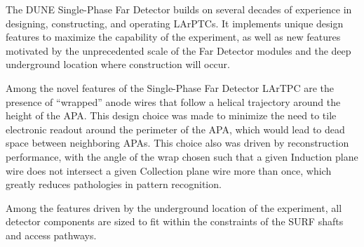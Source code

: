 The DUNE Single-Phase Far Detector builds on several decades of experience in
designing, constructing, and operating LArPTCs.  It implements unique design features to maximize the capability of the experiment, as well
as new features motivated by the unprecedented scale of the Far Detector
modules and the deep underground location where construction will occur.

Among the novel features of the Single-Phase Far Detector LArTPC are the
presence of ``wrapped'' anode wires that follow a helical trajectory around
the height of the APA.  This design choice was made to minimize the need to
tile electronic readout around the perimeter of the APA, which would lead to
dead space between neighboring APAs.  This choice also was driven by
reconstruction performance, with the angle of the wrap chosen such that a
given Induction plane wire does not intersect a given Collection plane wire
more than once, which greatly reduces pathologies in pattern recognition. 

Among the features driven by the underground location of the experiment, all
detector components are sized to fit within the constraints of the SURF shafts
and access pathways.








